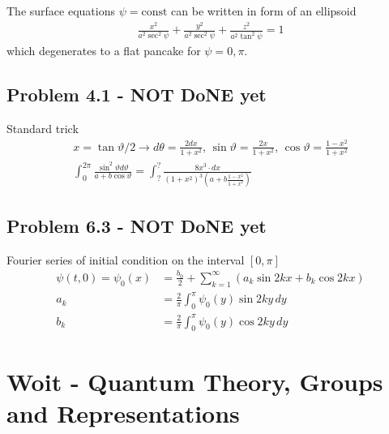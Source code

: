 \documentclass[../main.tex]{subfiles}
\begin{document}
The surface equations $\psi=\text{const}$ can be written in form of an ellipsoid
\begin{align}
    \frac{x^2}{a^2\sec^2\psi}+\frac{y^2}{a^2\sec^2\psi}+\frac{z^2}{a^2\tan^2\psi}=1
\end{align}
which degenerates to a flat pancake for $\psi=0,\pi$.

\subsection{Problem 4.1 - NOT DoNE yet}
Standard trick
\begin{align}
    x=\tan\vartheta/2\rightarrow d\theta =\frac{2dx}{1+x^2},\,\sin\vartheta=\frac{2x}{1+x^2},\,\cos\vartheta=\frac{1-x^2}{1+x^2}\\
    \int_0^{2\pi}\frac{\sin^2\vartheta d\vartheta}{a+b\cos\vartheta}=\int_?^{?}\frac{8x^3\cdot dx}{(1+x^2)^3(a+b\frac{1-x^2}{1+x^2})}
\end{align}

\subsection{Problem 6.3 - NOT DoNE yet}
Fourier series of initial condition on the interval $[0,\pi]$
\begin{align}
\psi(t,0)=\psi_0(x)
&=\frac{b_0}{2}+\sum_{k=1}^\infty(a_k\sin 2kx+b_k\cos 2kx)\\
a_k
&=\frac{2}{\pi}\int_{0}^\pi\psi_0(y)\sin 2ky\,dy\\
b_k
&=\frac{2}{\pi}\int_{0}^\pi\psi_0(y)\cos 2ky\,dy
\end{align}


\section{{\sc Woit} - Quantum Theory, Groups and Representations}
\end{document}
